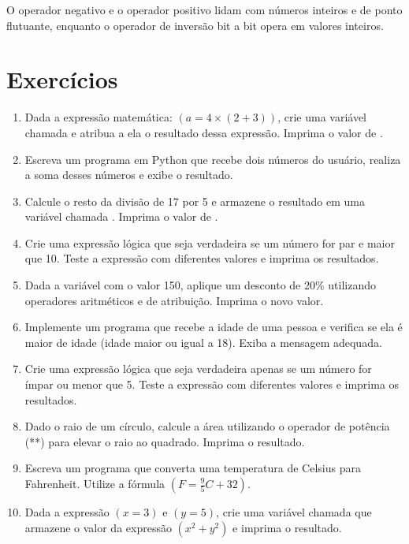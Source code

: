 \documentclass[letterpaper,10pt,english]{jupyterBook}
\begin{document}
\sphinxAtStartPar
O operador negativo e o operador positivo lidam com números inteiros e de ponto flutuante, enquanto o operador de inversão bit a bit opera em valores inteiros.


\section{Exercícios}
\label{\detokenize{chapters/ch3/ch3:exercicios}}\begin{enumerate}
%
\item {} 
\sphinxAtStartPar
Dada a expressão matemática: \((a = 4 \times (2 + 3))\), crie uma variável chamada  e atribua a ela o resultado dessa expressão. Imprima o valor de .

\item {} 
\sphinxAtStartPar
Escreva um programa em Python que recebe dois números do usuário, realiza a soma desses números e exibe o resultado.

\item {} 
\sphinxAtStartPar
Calcule o resto da divisão de 17 por 5 e armazene o resultado em uma variável chamada . Imprima o valor de .

\item {} 
\sphinxAtStartPar
Crie uma expressão lógica que seja verdadeira se um número for par e maior que 10. Teste a expressão com diferentes valores e imprima os resultados.

\item {} 
\sphinxAtStartPar
Dada a variável  com o valor 150, aplique um desconto de 20\% utilizando operadores aritméticos e de atribuição. Imprima o novo valor.

\item {} 
\sphinxAtStartPar
Implemente um programa que recebe a idade de uma pessoa e verifica se ela é maior de idade (idade maior ou igual a 18). Exiba a mensagem adequada.

\item {} 
\sphinxAtStartPar
Crie uma expressão lógica que seja verdadeira apenas se um número for ímpar ou menor que 5. Teste a expressão com diferentes valores e imprima os resultados.

\item {} 
\sphinxAtStartPar
Dado o raio de um círculo, calcule a área utilizando o operador de potência (**) para elevar o raio ao quadrado. Imprima o resultado.

\item {} 
\sphinxAtStartPar
Escreva um programa que converta uma temperatura de Celsius para Fahrenheit. Utilize a fórmula \((F = \frac{9}{5}C + 32)\).

\item {} 
\sphinxAtStartPar
Dada a expressão \((x = 3)\) e \((y = 5)\), crie uma variável chamada  que armazene o valor da expressão \((x^2 + y^2)\) e imprima o resultado.

\end{enumerate}
\end{document}
